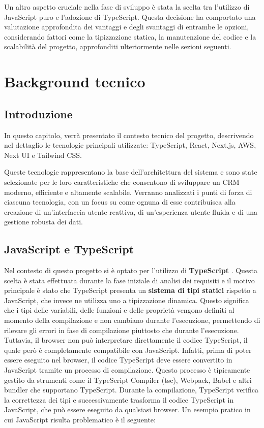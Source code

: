 \documentclass[target=bach,aauheader=,style=]{thud}
\begin{document}
\noindent Un altro aspetto cruciale nella fase di sviluppo è stata la scelta tra l'utilizzo di JavaScript puro e l'adozione di TypeScript. Questa decisione ha comportato una valutazione approfondita dei vantaggi e degli svantaggi di entrambe le opzioni, considerando fattori come la tipizzazione statica, la manutenzione del codice e la scalabilità del progetto, approfonditi ulteriormente nelle sezioni seguenti.


\chapter{Background tecnico}

\section{Introduzione}
In questo capitolo, verrà presentato il contesto tecnico del progetto, descrivendo nel dettaglio le tecnologie principali utilizzate: TypeScript, React, Next.js, AWS, Next UI e Tailwind CSS. 

\noindent Queste tecnologie rappresentano la base dell'architettura del sistema e sono state selezionate per le loro caratteristiche che consentono di sviluppare un CRM moderno, efficiente e altamente scalabile. Verranno analizzati i punti di forza di ciascuna tecnologia, con un focus su come ognuna di esse contribuisca alla creazione di un'interfaccia utente reattiva, di un'esperienza utente fluida e di una gestione robusta dei dati.

\section{JavaScript e TypeScript}
Nel contesto di questo progetto si è optato per l'utilizzo di \textbf{TypeScript} \cite{wikipedia:typescript}. Questa scelta è stata effettuata durante la fase iniziale di analisi dei requisiti e il motivo principale è stato che TypeScript presenta un \textbf{sistema di tipi statici} rispetto a JavaScript, che invece ne utilizza uno a tipizzazione dinamica. Questo significa che i tipi delle variabili, delle funzioni e delle proprietà vengono definiti al momento della compilazione e non cambiano durante l'esecuzione, permettendo di rilevare gli errori in fase di compilazione piuttosto che durante l'esecuzione. Tuttavia, il browser non può interpretare direttamente il codice TypeScript, il quale però è completamente compatibile con JavaScript. Infatti, prima di poter essere eseguito nel browser, il codice TypeScript deve essere convertito in JavaScript tramite un processo di compilazione. Questo processo è tipicamente gestito da strumenti come il TypeScript Compiler (tsc), Webpack, Babel e altri bundler che supportano TypeScript. Durante la compilazione, TypeScript verifica la correttezza dei tipi e successivamente trasforma il codice TypeScript in JavaScript, che può essere eseguito da qualsiasi browser. Un esempio pratico in cui JavaScript risulta problematico è il seguente: 
\end{document}
